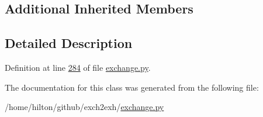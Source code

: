 \subsection*{Additional Inherited Members}


\subsection{Detailed Description}


Definition at line \hyperlink{exchange_8py_source_l00284}{284} of file \hyperlink{exchange_8py_source}{exchange.\+py}.



The documentation for this class was generated from the following file\+:\begin{DoxyCompactItemize}
\item 
/home/hilton/github/exch2exh/\hyperlink{exchange_8py}{exchange.\+py}\end{DoxyCompactItemize}
